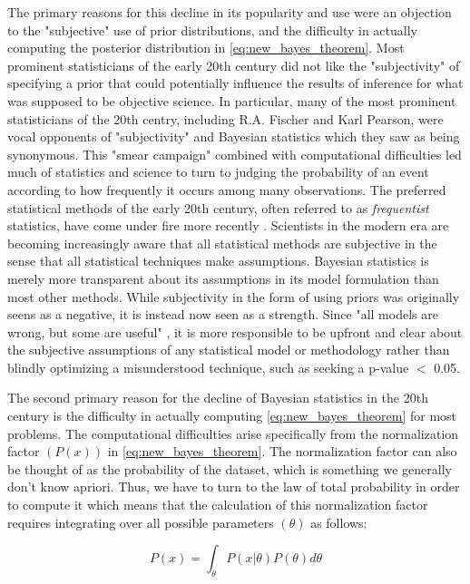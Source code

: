 The primary reasons for this decline in its popularity and use were an objection to the "subjective" use of prior distributions, and the difficulty in actually computing the posterior distribution in \ref{eq:new_bayes_theorem}. Most prominent statisticians of the early 20th century did not like the "subjectivity" of specifying a prior that could potentially influence the results of inference for what was supposed to be objective science. In particular, many of the most prominent statisticians of the 20th centry, including R.A. Fischer and Karl Pearson, were vocal opponents of "subjectivity" and Bayesian statistics which they saw as being synonymous. This "smear campaign" combined with computational difficulties led much of statistics and science to turn to judging the probability of an event according to how frequently it occurs among many observations. The preferred statistical methods of the early 20th century, often referred to as \textit{frequentist} statistics, have come under fire more recently \cite{Ioannidis2005} \cite{Begley2015}. Scientists in the modern era are becoming increasingly aware that all statistical methods are subjective in the sense that all statistical techniques make assumptions. Bayesian statistics is merely more transparent about its assumptions in its model formulation than most other methods. While subjectivity in the form of using priors was originally seens as a negative, it is instead now seen as a strength. Since "all models are wrong, but some are useful" \cite{Box1976}, it is more responsible to be upfront and clear about the subjective assumptions of any statistical model or methodology rather than blindly optimizing a misunderstood technique, such as seeking a p-value $<$ 0.05.

The second primary reason for the decline of Bayesian statistics in the 20th century is the difficulty in actually computing \ref{eq:new_bayes_theorem} for most problems. The computational difficulties arise specifically from the normalization factor $(P(x))$ in \ref{eq:new_bayes_theorem}. The normalization factor can also be thought of as the probability of the dataset, which is something we generally don't know apriori. Thus, we have to turn to the law of total probability in order to compute it which means that the calculation of this normalization factor requires integrating over all possible parameters $(\theta)$ as follows:

\begin{equation} \label{eq:normalization_factor}
P(x) = \int_{\theta} P(x|\theta)P(\theta) d\theta
\end{equation}

